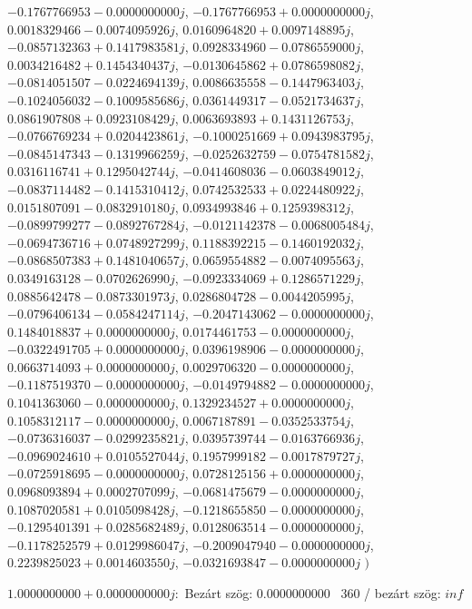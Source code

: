 \documentclass[14pt,a4paper]{article}
\begin{document}
\begin{itemize}
$-0.1767766953-0.0000000000j$, $-0.1767766953+0.0000000000j$, $0.0018329466-0.0074095926j$, $0.0160964820+0.0097148895j$, $-0.0857132363+0.1417983581j$, $0.0928334960-0.0786559000j$, $0.0034216482+0.1454340437j$, $-0.0130645862+0.0786598082j$, $-0.0814051507-0.0224694139j$, $0.0086635558-0.1447963403j$, $-0.1024056032-0.1009585686j$, $0.0361449317-0.0521734637j$, $0.0861907808+0.0923108429j$, $0.0063693893+0.1431126753j$, $-0.0766769234+0.0204423861j$, $-0.1000251669+0.0943983795j$, $-0.0845147343-0.1319966259j$, $-0.0252632759-0.0754781582j$, $0.0316116741+0.1295042744j$, $-0.0414608036-0.0603849012j$, $-0.0837114482-0.1415310412j$, $0.0742532533+0.0224480922j$, $0.0151807091-0.0832910180j$, $0.0934993846+0.1259398312j$, $-0.0899799277-0.0892767284j$, $-0.0121142378-0.0068005484j$, $-0.0694736716+0.0748927299j$, $0.1188392215-0.1460192032j$, $-0.0868507383+0.1481040657j$, $0.0659554882-0.0074095563j$, $0.0349163128-0.0702626990j$, $-0.0923334069+0.1286571229j$, $0.0885642478-0.0873301973j$, $0.0286804728-0.0044205995j$, $-0.0796406134-0.0584247114j$, $-0.2047143062-0.0000000000j$, $0.1484018837+0.0000000000j$, $0.0174461753-0.0000000000j$, $-0.0322491705+0.0000000000j$, $0.0396198906-0.0000000000j$, $0.0663714093+0.0000000000j$, $0.0029706320-0.0000000000j$, $-0.1187519370-0.0000000000j$, $-0.0149794882-0.0000000000j$, $0.1041363060-0.0000000000j$, $0.1329234527+0.0000000000j$, $0.1058312117-0.0000000000j$, $0.0067187891-0.0352533754j$, $-0.0736316037-0.0299235821j$, $0.0395739744-0.0163766936j$, $-0.0969024610+0.0105527044j$, $0.1957999182-0.0017879727j$, $-0.0725918695-0.0000000000j$, $0.0728125156+0.0000000000j$, $0.0968093894+0.0002707099j$, $-0.0681475679-0.0000000000j$, $0.1087020581+0.0105098428j$, $-0.1218655850-0.0000000000j$, $-0.1295401391+0.0285682489j$, $0.0128063514-0.0000000000j$, $-0.1178252579+0.0129986047j$, $-0.2009047940-0.0000000000j$, $0.2239825023+0.0014603550j$, $-0.0321693847-0.0000000000j$
$\big)$
\end{itemize}
$1.0000000000+0.0000000000j$:\
Bezárt szög: $0.0000000000$ \
360 / bezárt szög: $inf$\
\end{document}
